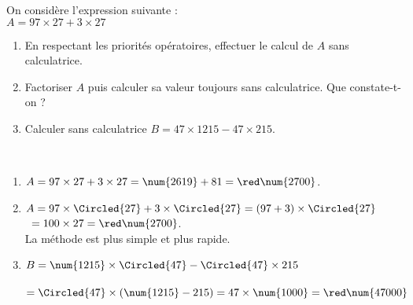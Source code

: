 \begin{exercice*} %
   On considère l'expression suivante : \\
   $A=97\times27+3\times27$
   \begin{enumerate}
      \item En respectant les priorités opératoires, effectuer le calcul de $A$ sans calculatrice.
      \item Factoriser $A$ puis calculer sa valeur toujours sans calculatrice. Que constate-t-on ?
      \item Calculer sans calculatrice $B =47\times\num{1215}-47\times215$.
   \end{enumerate}
\end{exercice*}  

\begin{corrige}
   \ \\ [-5mm]
   \begin{enumerate}
      \item $A=97\times27+3\times27 =\num{2619}+81 =\red\num{2700}$.
      \item $A=97\times\Circled{27}+3\times\Circled{27} =(97+3)\times\Circled{27}$ \\
         \quad\, $=100\times27 =\red\num{2700}$. \\
         {\red La méthode  est plus simple et plus rapide}. 
      \item $B =\num{1215}\times\Circled{47}-\Circled{47}\times215$ \\
         \quad\, $=\Circled{47}\times(\num{1215}-215) =47\times\num{1000} =\red \num{47000}$
   \end{enumerate}
\end{corrige}  
